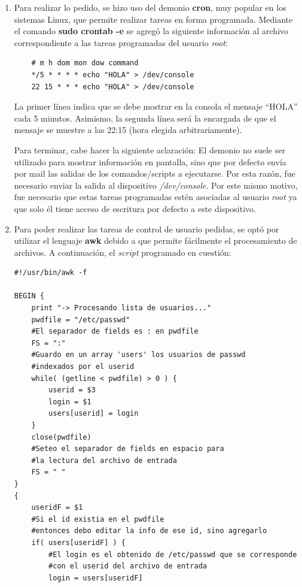 \documentclass[a4paper,11pt] {article}
\begin{document}
\begin{enumerate}
	\item Para realizar lo pedido, se hizo uso del demonio \textbf{cron}, muy popular en los sistemas Linux, que permite realizar tareas en forma programada. Mediante el comando \textbf{sudo crontab -e} se agregó la siguiente información al archivo correspondiente a las tareas programadas del usuario \textit{root}:

	\begin{verbatim}
	# m h dom mon dow command
	*/5 * * * * echo "HOLA" > /dev/console
	22 15 * * * echo "HOLA" > /dev/console
	\end{verbatim}

	La primer línea indica que se debe mostrar en la consola el mensaje ``HOLA'' cada 5 minutos. Asimismo, la segunda línea será la encargada de que el mensaje se muestre a las 22:15 (hora elegida arbitrariamente). 

	Para terminar, cabe hacer la siguiente aclaración: El demonio no suele ser utilizado para mostrar información en pantalla, sino que por defecto envía por mail las salidas de los comandos/scripts a ejecutarse. Por esta razón, fue necesario enviar la salida al dispositivo \textit{/dev/console}. Por este mismo motivo, fue necesario que estas tareas programadas estén asociadas al usuario \textit{root} ya que solo él tiene acceso de escritura por defecto a este dispositivo.

	\item Para poder realizar las tareas de control de usuario pedidas, se optó por utilizar el lenguaje \textbf{awk} debido a que permite fácilmente el procesamiento de archivos. A continuación, el \textit{script} programado en cuestión:

	\begin{verbatim}
#!/usr/bin/awk -f

BEGIN { 
    print "-> Procesando lista de usuarios..."
    pwdfile = "/etc/passwd"
    #El separador de fields es : en pwdfile
    FS = ":"
    #Guardo en un array 'users' los usuarios de passwd 
    #indexados por el userid
    while( (getline < pwdfile) > 0 ) {
        userid = $3
        login = $1
        users[userid] = login
    }
    close(pwdfile)
    #Seteo el separador de fields en espacio para 
    #la lectura del archivo de entrada
    FS = " "
}
{
    useridF = $1
    #Si el id existia en el pwdfile
    #entonces debo editar la info de ese id, sino agregarlo
    if( users[useridF] ) {
        #El login es el obtenido de /etc/passwd que se corresponde
        #con el userid del archivo de entrada
        login = users[useridF]


\end{verbatim}
\end{enumerate}
\end{document}
